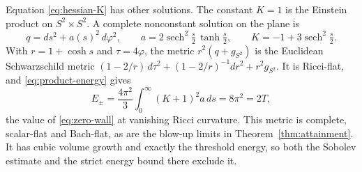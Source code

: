 Equation \eqref{eq:hessian-K} has other solutions. The constant
\(K=1\) is the Einstein product on \(S^2\times S^2\). A complete
nonconstant solution on the plane is
\[
 q=ds^2+a(s)^2\,d\varphi^2,\qquad
 a=2\operatorname{sech}^2\!\tfrac s2\,\tanh\tfrac s2,\qquad
 K=-1+3\operatorname{sech}^2\!\tfrac s2 .
\]
With \(r=1+\cosh s\) and \(\tau=4\varphi\), the metric
\(r^2(q+g_{S^2})\) is the Euclidean Schwarzschild metric
\((1-2/r)\,d\tau^2+(1-2/r)^{-1}dr^2+r^2g_{S^2}\). It is Ricci-flat,
and \eqref{eq:product-energy} gives
\[
 E_\pm=\frac{4\pi^2}{3}\int_0^\infty(K+1)^2a\,ds=8\pi^2=2T ,
\]
the value of \eqref{eq:zero-wall} at vanishing Ricci curvature. This
metric is complete, scalar-flat and Bach-flat, as are the blow-up
limits in Theorem~\ref{thm:attainment}. It has cubic volume growth and
exactly the threshold energy, so both the Sobolev estimate and the
strict energy bound there exclude it.
